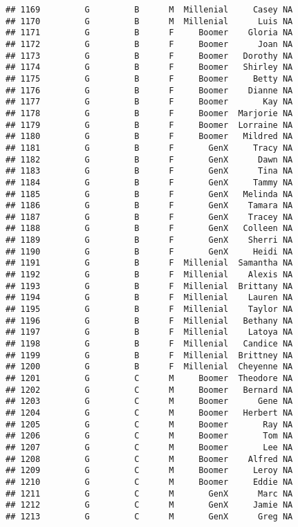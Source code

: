 \documentclass[
]{article}
\begin{document}
\begin{verbatim}
## 1169         G         B      M  Millenial     Casey NA
## 1170         G         B      M  Millenial      Luis NA
## 1171         G         B      F     Boomer    Gloria NA
## 1172         G         B      F     Boomer      Joan NA
## 1173         G         B      F     Boomer   Dorothy NA
## 1174         G         B      F     Boomer   Shirley NA
## 1175         G         B      F     Boomer     Betty NA
## 1176         G         B      F     Boomer    Dianne NA
## 1177         G         B      F     Boomer       Kay NA
## 1178         G         B      F     Boomer  Marjorie NA
## 1179         G         B      F     Boomer  Lorraine NA
## 1180         G         B      F     Boomer   Mildred NA
## 1181         G         B      F       GenX     Tracy NA
## 1182         G         B      F       GenX      Dawn NA
## 1183         G         B      F       GenX      Tina NA
## 1184         G         B      F       GenX     Tammy NA
## 1185         G         B      F       GenX   Melinda NA
## 1186         G         B      F       GenX    Tamara NA
## 1187         G         B      F       GenX    Tracey NA
## 1188         G         B      F       GenX   Colleen NA
## 1189         G         B      F       GenX    Sherri NA
## 1190         G         B      F       GenX     Heidi NA
## 1191         G         B      F  Millenial  Samantha NA
## 1192         G         B      F  Millenial    Alexis NA
## 1193         G         B      F  Millenial  Brittany NA
## 1194         G         B      F  Millenial    Lauren NA
## 1195         G         B      F  Millenial    Taylor NA
## 1196         G         B      F  Millenial   Bethany NA
## 1197         G         B      F  Millenial    Latoya NA
## 1198         G         B      F  Millenial   Candice NA
## 1199         G         B      F  Millenial  Brittney NA
## 1200         G         B      F  Millenial  Cheyenne NA
## 1201         G         C      M     Boomer  Theodore NA
## 1202         G         C      M     Boomer   Bernard NA
## 1203         G         C      M     Boomer      Gene NA
## 1204         G         C      M     Boomer   Herbert NA
## 1205         G         C      M     Boomer       Ray NA
## 1206         G         C      M     Boomer       Tom NA
## 1207         G         C      M     Boomer       Lee NA
## 1208         G         C      M     Boomer    Alfred NA
## 1209         G         C      M     Boomer     Leroy NA
## 1210         G         C      M     Boomer     Eddie NA
## 1211         G         C      M       GenX      Marc NA
## 1212         G         C      M       GenX     Jamie NA
## 1213         G         C      M       GenX      Greg NA

\end{verbatim}
\end{document}
